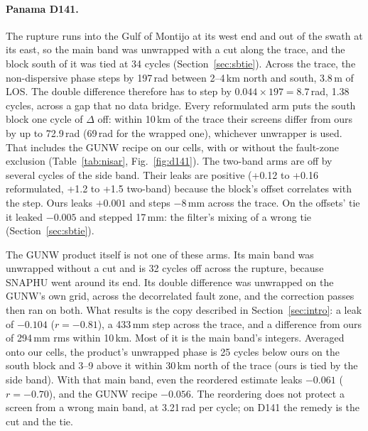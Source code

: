 \paragraph{Panama D141.} The rupture runs into the Gulf of Montijo at its west end and out of the swath at its east,
so the main band was unwrapped with a cut along the trace, and the block south of it was tied at 34 cycles
(Section~\ref{sec:sbtie}). Across the
trace, the non-dispersive phase steps by 197\,rad between 2--4\,km north and south, 3.8\,m of LOS. The double
difference therefore has to step by $0.044\times197 = 8.7$\,rad, 1.38 cycles, across a gap that no data bridge.
Every reformulated arm puts the south block one cycle of $\Delta$ off: within 10\,km of the trace their screens differ
from ours by up to 72.9\,rad (69\,rad for the wrapped one), whichever unwrapper is used. That includes the GUNW recipe on our cells, with or
without the fault-zone exclusion (Table~\ref{tab:nisar}, Fig.~\ref{fig:d141}). The two-band arms are off by several
cycles of the side band. Their leaks are positive (+0.12 to +0.16 reformulated, +1.2 to +1.5 two-band) because the
block's offset correlates with the step. Ours leaks $+0.001$ and steps $-8$\,mm across the trace. On the offsets' tie
it leaked $-0.005$ and stepped 17\,mm: the filter's mixing of a wrong tie (Section~\ref{sec:sbtie}).

The GUNW product itself is not one of these arms. Its main band was unwrapped without a cut and is 32 cycles off
across the rupture, because SNAPHU went around its end. Its double difference was unwrapped on the GUNW's own grid,
across the decorrelated fault zone, and the correction passes then ran on both. What results is the copy described in
Section~\ref{sec:intro}: a leak of $-0.104$ ($r=-0.81$), a 433\,mm step across the trace, and a difference from ours of
294\,mm rms within 10\,km. Most of it is the main band's integers. Averaged onto our cells, the product's unwrapped
phase is 25 cycles below ours on the south block and 3--9 above it within 30\,km north of the trace (ours is tied by
the side band). With that main band, even the reordered estimate leaks $-0.061$ ($r=-0.70$), and the GUNW recipe
$-0.056$. The reordering does not protect a screen from a wrong main band, at 3.21\,rad per cycle; on D141 the
remedy is the cut and the tie.

